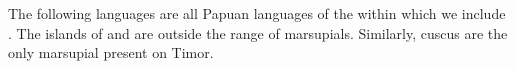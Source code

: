 The following languages are all Papuan languages of the 
within which we include .
The islands of 
and  are outside the range of marsupials.
Similarly, cuscus are the only marsupial present on Timor.

%
